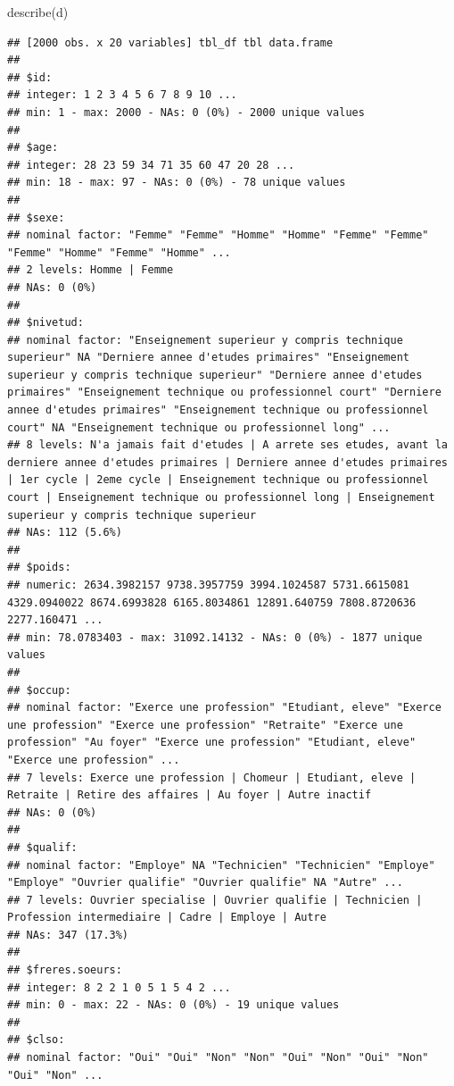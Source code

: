 \documentclass[
]{book}
\newenvironment{Shaded}{\begin{snugshade}}{\end{snugshade}}
\newcommand{\FunctionTok}[1]{\textcolor[rgb]{0.00,0.00,0.00}{#1}}
\newcommand{\NormalTok}[1]{#1}
\begin{document}
\begin{Shaded}
\begin{Highlighting}[]
\FunctionTok{describe}\NormalTok{(d)}
\end{Highlighting}
\end{Shaded}

\begin{verbatim}
## [2000 obs. x 20 variables] tbl_df tbl data.frame
## 
## $id: 
## integer: 1 2 3 4 5 6 7 8 9 10 ...
## min: 1 - max: 2000 - NAs: 0 (0%) - 2000 unique values
## 
## $age: 
## integer: 28 23 59 34 71 35 60 47 20 28 ...
## min: 18 - max: 97 - NAs: 0 (0%) - 78 unique values
## 
## $sexe: 
## nominal factor: "Femme" "Femme" "Homme" "Homme" "Femme" "Femme" "Femme" "Homme" "Femme" "Homme" ...
## 2 levels: Homme | Femme
## NAs: 0 (0%)
## 
## $nivetud: 
## nominal factor: "Enseignement superieur y compris technique superieur" NA "Derniere annee d'etudes primaires" "Enseignement superieur y compris technique superieur" "Derniere annee d'etudes primaires" "Enseignement technique ou professionnel court" "Derniere annee d'etudes primaires" "Enseignement technique ou professionnel court" NA "Enseignement technique ou professionnel long" ...
## 8 levels: N'a jamais fait d'etudes | A arrete ses etudes, avant la derniere annee d'etudes primaires | Derniere annee d'etudes primaires | 1er cycle | 2eme cycle | Enseignement technique ou professionnel court | Enseignement technique ou professionnel long | Enseignement superieur y compris technique superieur
## NAs: 112 (5.6%)
## 
## $poids: 
## numeric: 2634.3982157 9738.3957759 3994.1024587 5731.6615081 4329.0940022 8674.6993828 6165.8034861 12891.640759 7808.8720636 2277.160471 ...
## min: 78.0783403 - max: 31092.14132 - NAs: 0 (0%) - 1877 unique values
## 
## $occup: 
## nominal factor: "Exerce une profession" "Etudiant, eleve" "Exerce une profession" "Exerce une profession" "Retraite" "Exerce une profession" "Au foyer" "Exerce une profession" "Etudiant, eleve" "Exerce une profession" ...
## 7 levels: Exerce une profession | Chomeur | Etudiant, eleve | Retraite | Retire des affaires | Au foyer | Autre inactif
## NAs: 0 (0%)
## 
## $qualif: 
## nominal factor: "Employe" NA "Technicien" "Technicien" "Employe" "Employe" "Ouvrier qualifie" "Ouvrier qualifie" NA "Autre" ...
## 7 levels: Ouvrier specialise | Ouvrier qualifie | Technicien | Profession intermediaire | Cadre | Employe | Autre
## NAs: 347 (17.3%)
## 
## $freres.soeurs: 
## integer: 8 2 2 1 0 5 1 5 4 2 ...
## min: 0 - max: 22 - NAs: 0 (0%) - 19 unique values
## 
## $clso: 
## nominal factor: "Oui" "Oui" "Non" "Non" "Oui" "Non" "Oui" "Non" "Oui" "Non" ...

\end{verbatim}
\end{document}

